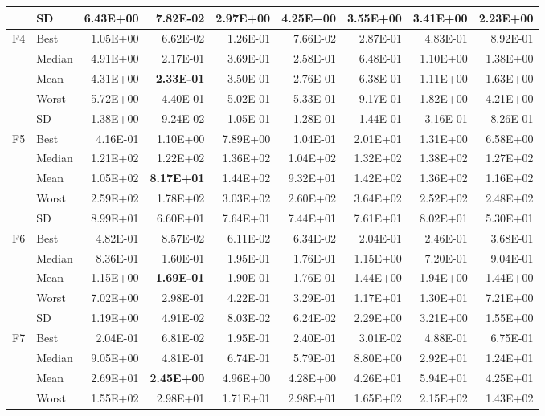 \documentclass[algorithms,article,submit,moreauthors,pdftex]{Definitions/mdpi}
\newcommand{\bestval}[1]{\textbf{#1}}
\begin{document}
\begin{table}[p]
{\begin{tabular}{llrrrrrrr}
 & SD & 6.43E+00 & 7.82E-02 & 2.97E+00 & 4.25E+00 & 3.55E+00 & 3.41E+00 & 2.23E+00 \\
\midrule
F4 & Best & 1.05E+00 & 6.62E-02 & 1.26E-01 & 7.66E-02 & 2.87E-01 & 4.83E-01 & 8.92E-01 \\
 & Median & 4.91E+00 & 2.17E-01 & 3.69E-01 & 2.58E-01 & 6.48E-01 & 1.10E+00 & 1.38E+00 \\
 & Mean & 4.31E+00 & \bestval{2.33E-01} & 3.50E-01 & 2.76E-01 & 6.38E-01 & 1.11E+00 & 1.63E+00 \\
 & Worst & 5.72E+00 & 4.40E-01 & 5.02E-01 & 5.33E-01 & 9.17E-01 & 1.82E+00 & 4.21E+00 \\
 & SD & 1.38E+00 & 9.24E-02 & 1.05E-01 & 1.28E-01 & 1.44E-01 & 3.16E-01 & 8.26E-01 \\
\midrule
F5 & Best & 4.16E-01 & 1.10E+00 & 7.89E+00 & 1.04E-01 & 2.01E+01 & 1.31E+00 & 6.58E+00 \\
 & Median & 1.21E+02 & 1.22E+02 & 1.36E+02 & 1.04E+02 & 1.32E+02 & 1.38E+02 & 1.27E+02 \\
 & Mean & 1.05E+02 & \bestval{8.17E+01} & 1.44E+02 & 9.32E+01 & 1.42E+02 & 1.36E+02 & 1.16E+02 \\
 & Worst & 2.59E+02 & 1.78E+02 & 3.03E+02 & 2.60E+02 & 3.64E+02 & 2.52E+02 & 2.48E+02 \\
 & SD & 8.99E+01 & 6.60E+01 & 7.64E+01 & 7.44E+01 & 7.61E+01 & 8.02E+01 & 5.30E+01 \\
\midrule
F6 & Best & 4.82E-01 & 8.57E-02 & 6.11E-02 & 6.34E-02 & 2.04E-01 & 2.46E-01 & 3.68E-01 \\
 & Median & 8.36E-01 & 1.60E-01 & 1.95E-01 & 1.76E-01 & 1.15E+00 & 7.20E-01 & 9.04E-01 \\
 & Mean & 1.15E+00 & \bestval{1.69E-01} & 1.90E-01 & 1.76E-01 & 1.44E+00 & 1.94E+00 & 1.44E+00 \\
 & Worst & 7.02E+00 & 2.98E-01 & 4.22E-01 & 3.29E-01 & 1.17E+01 & 1.30E+01 & 7.21E+00 \\
 & SD & 1.19E+00 & 4.91E-02 & 8.03E-02 & 6.24E-02 & 2.29E+00 & 3.21E+00 & 1.55E+00 \\
\midrule
F7 & Best & 2.04E-01 & 6.81E-02 & 1.95E-01 & 2.40E-01 & 3.01E-02 & 4.88E-01 & 6.75E-01 \\
 & Median & 9.05E+00 & 4.81E-01 & 6.74E-01 & 5.79E-01 & 8.80E+00 & 2.92E+01 & 1.24E+01 \\
 & Mean & 2.69E+01 & \bestval{2.45E+00} & 4.96E+00 & 4.28E+00 & 4.26E+01 & 5.94E+01 & 4.25E+01 \\
 & Worst & 1.55E+02 & 2.98E+01 & 1.71E+01 & 2.98E+01 & 1.65E+02 & 2.15E+02 & 1.43E+02 \\

\end{tabular}}
\end{table}
\end{document}

